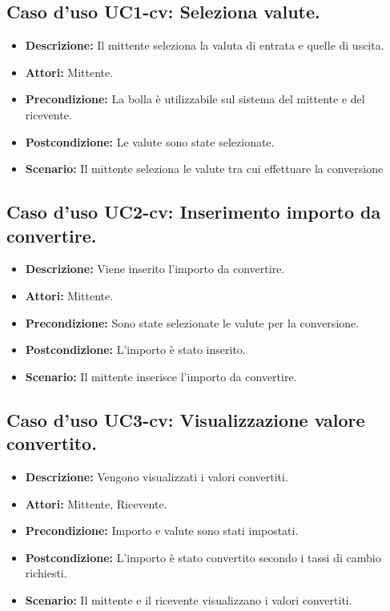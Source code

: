 \subsection{Caso d'uso UC1-cv: Seleziona valute.}
\begin{itemize}
\item[]\textbf{Descrizione:} Il mittente seleziona la valuta di entrata e quelle di uscita.
\item[]\textbf{Attori:} Mittente. 
\item[]\textbf{Precondizione:} La bolla è utilizzabile sul sistema del mittente e del ricevente. 
\item[]\textbf{Postcondizione:} Le valute sono state selezionate. 
\item[]\textbf{Scenario:}
Il mittente seleziona le valute tra cui effettuare la conversione 
\end{itemize}

\subsection{Caso d'uso UC2-cv: Inserimento importo da convertire.}
\begin{itemize}
\item[]\textbf{Descrizione:} Viene inserito l'importo da convertire.
\item[]\textbf{Attori:} Mittente. 
\item[]\textbf{Precondizione:} Sono state selezionate le valute per la conversione. 
\item[]\textbf{Postcondizione:} L'importo è stato inserito. 
\item[]\textbf{Scenario:}
Il mittente inserisce l'importo da convertire. 
\end{itemize}

\subsection{Caso d'uso UC3-cv: Visualizzazione valore convertito.}
\begin{itemize}
\item[]\textbf{Descrizione:} Vengono visualizzati i valori convertiti.
\item[]\textbf{Attori:} Mittente, Ricevente. 
\item[]\textbf{Precondizione:} Importo e valute sono stati impostati. 
\item[]\textbf{Postcondizione:} L'importo è stato convertito secondo i tassi di cambio richiesti. 
\item[]\textbf{Scenario:}
Il mittente e il ricevente visualizzano i valori convertiti. 
\end{itemize}

